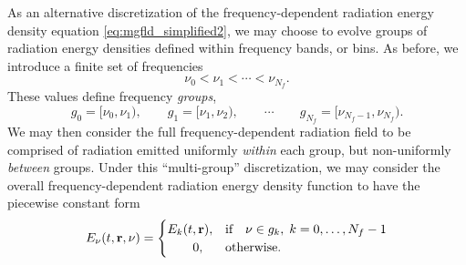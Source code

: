 \documentclass[10pt]{article}
\renewcommand{\(}{\left(}
\renewcommand{\)}{\right)}
\newcommand{\rvec}{{\bf r}}
\newcommand{\Enu}{E_{\nu}}
\begin{document}
As an alternative discretization of the frequency-dependent radiation
energy density equation \eqref{eq:mgfld_simplified2}, we may choose to
evolve groups of radiation energy densities defined within frequency
bands, or bins.  As before, we introduce a finite set of frequencies
\begin{equation}
\label{eq:bin_bounds}
  \nu_0 < \nu_1 < \cdots < \nu_{N_f}.
\end{equation}
These values define frequency {\em groups}, 
\begin{equation}
\label{eq:frequency_groups}
  g_0 = [\nu_0,\nu_1), \qquad   g_1 = [\nu_1,\nu_2), 
  \qquad \cdots \qquad
  g_{N_f} = [\nu_{N_f-1},\nu_{N_f}).
\end{equation}
We may then consider the full frequency-dependent radiation field to
be comprised of radiation emitted uniformly {\em within} each group,
but non-uniformly {\em between} groups.  Under this ``multi-group''
discretization, we may consider the overall frequency-dependent
radiation energy density function to have the piecewise constant form  
\begin{equation}
\label{eq:radiation_multigroup}
  \Enu(t,\rvec,\nu) = \begin{cases}
    E_k(t,\rvec), & \text{if}\quad \nu \in g_k, \; k=0,\ldots,N_f-1\\
    \qquad 0, & \text{otherwise}.
  \end{cases}
\end{equation}
\end{document}
